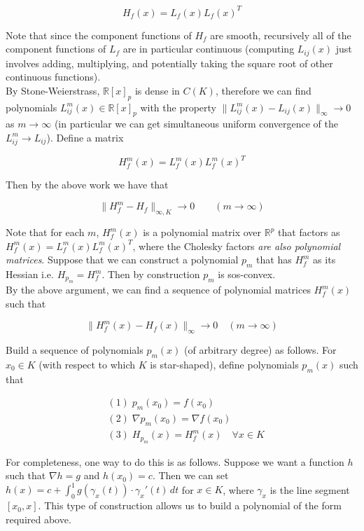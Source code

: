 \documentclass[11pt,reqno]{amsart}
\theoremstyle{definition}
\numberwithin{equation}{section}
\newcommand{\mr}{\mathbb{R}}
\begin{document}
\[
H_f(x) = L_f(x)L_f(x)^T
\]

Note that since the component functions of $H_f$ are smooth, recursively all of the component functions of $L_f$ are in particular continuous (computing $L_{ij}(x)$ just involves adding, multiplying, and potentially taking the square root of other continuous functions). \\

By Stone-Weierstrass, $\mr[x]_p$ is dense in $C(K)$, therefore we can find polynomials $L_{ij}^m(x) \in \mr[x]_p$ with the property $\|L_{ij}^m(x) - L_{ij}(x)\|_{\infty} \to 0 $ as $m \to \infty$ (in particular we can get simultaneous uniform convergence of the $L_{ij}^m \to L_{ij}$). Define a matrix 

\[
H_f^m(x) = L_f^m(x)L_f^m(x)^T
\]

Then by the above work we have that 

\[
\|H_f^m - H_f\|_{\infty,K} \to 0 \qquad (m \to \infty )
\]

Note that for each $m$, $H_f^m(x)$ is a polynomial matrix over $\mr^p$ that factors as $H_f^m(x) = L_f^m(x)L_f^m(x)^T$, where the Cholesky factors \emph{are also polynomial matrices}. Suppose that we can construct a polynomial $p_m$ that has $H_f^m$ as its Hessian i.e. $H_{p_m} = H_f^m$. Then by construction $p_m$ is sos-convex. \\

By the above argument, we can find a sequence of polynomial matrices $H_f^m(x)$ such that 

\[
\|H_f^m(x) - H_f(x) \|_{\infty} \to 0 \quad (m \to \infty) 
\]

Build a sequence of polynomials $p_m(x)$ (of arbitrary degree) as follows. For $x_0 \in K$ (with respect to which $K$ is star-shaped), define polynomials $p_m(x)$ such that 

\begin{align*} 
&(1) \; p_m(x_0) = f(x_0) \\
&(2) \; \nabla p_m(x_0) = \nabla f(x_0) \\
& (3) \; H_{p_m}(x) = H_f^m(x) \quad \forall x \in K
\end{align*}

For completeness, one way to do this is as follows. Suppose we want a function $h$ such that $\nabla h = g$ and $h(x_0) = c$. Then we can set $h(x) = c + \int_0^1 g(\gamma_x(t)) \cdot \gamma_x'(t) \, dt$ for $x \in K$, where $\gamma_x$ is the line segment $[x_0,x]$. This type of construction allows us to build a polynomial of the form required above. \\
\end{document}
